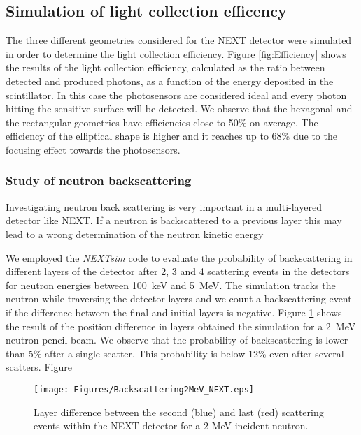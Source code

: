 \subsection{Simulation of light collection efficency}

The three different geometries considered for the NEXT detector were simulated in order to determine the light collection efficiency. Figure \ref{fig:Efficiency} shows the results of the light collection efficiency, calculated as the ratio between detected and produced photons, as a function of the energy deposited in the scintillator. In this case the photosensors are considered ideal and every photon hitting the sensitive surface will be detected. We observe that the hexagonal and the rectangular geometries have efficiencies close to 50\% on average. The efficiency of the elliptical shape is higher and it reaches up to 68\% due to the focusing effect towards the photosensors.


\subsubsection{Study of neutron backscattering}
Investigating neutron back scattering is very important in a multi-layered detector like NEXT. If a neutron is backscattered to a previous layer this may lead to a wrong determination  of the neutron kinetic energy 

We employed the \emph{NEXTsim} code to evaluate the probability of backscattering in different layers of the detector after 2, 3 and 4 scattering events in the detectors for neutron energies between 100~keV and 5~MeV. The simulation tracks the neutron while traversing the detector layers and we count a backscattering event if the difference between the final and initial layers is negative. Figure  \ref{fig:backscattering} shows the result of the position difference in layers obtained the simulation for a 2~MeV neutron pencil beam. We observe that the probability of backscattering is lower than 5\% after a single scatter. This probability is below 12\% even after several scatters. Figure  

\begin{figure}[htb]
\centering
\texttt{[image: Figures/Backscattering2MeV\_NEXT.eps]}
\caption{Layer difference between the second (blue) and last (red) scattering events within the NEXT detector for a 2 MeV incident neutron.}
\label{fig:backscattering}
\end{figure}



